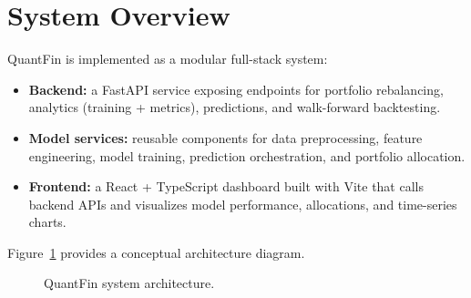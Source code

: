 \documentclass[conference]{IEEEtran}
\begin{document}
\section{System Overview}\label{sec:system}
QuantFin is implemented as a modular full-stack system:
\begin{itemize}
\item \textbf{Backend:} a FastAPI service exposing endpoints for portfolio rebalancing, analytics (training + metrics), predictions, and walk-forward backtesting.
\item \textbf{Model services:} reusable components for data preprocessing, feature engineering, model training, prediction orchestration, and portfolio allocation.
\item \textbf{Frontend:} a React + TypeScript dashboard built with Vite that calls backend APIs and visualizes model performance, allocations, and time-series charts.
\end{itemize}

Figure~\ref{fig:arch} provides a conceptual architecture diagram.

\begin{figure}[h!]
\begin{center}
\caption{QuantFin system architecture.}
\label{fig:arch}
\end{center}
\end{figure}
\end{document}
